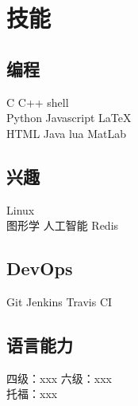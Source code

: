 \documentclass[]{deedy-resume-openfont}
\begin{document}
\begin{minipage}[t]{0.25\textwidth}

\section{技能}
\sectionsep
\subsection{编程}
C \textbullet{} C++ \textbullet{} shell \\
Python \textbullet{} Javascript \textbullet{} \LaTeX  \\
HTML \textbullet{} Java \textbullet{} lua \textbullet{} MatLab
\sectionsep

\subsection{兴趣}
Linux \\
图形学 \textbullet{} 人工智能 \textbullet{} Redis
\sectionsep

\subsection{DevOps}
Git \textbullet{} Jenkins \textbullet{} Travis CI
\sectionsep

\subsection{语言能力}
四级：xxx \textbullet{} 六级：xxx \\
托福：xxx
\sectionsep

%
%

\end{minipage} 
\hfill
\end{document}
